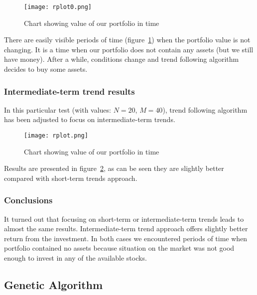 \begin{figure}[ht]
  
  \begin{center}
    \texttt{[image: rplot0.png]}
  \end{center}
  \caption{Chart showing value of our portfolio in time}
  \label{fig:trend-short}
\end{figure}

There are easily visible periods of time (figure~\ref{fig:trend-short}) when the portfolio value is not changing. 
It is a time when our portfolio does not contain any assets (but we still have money). 
After a while, conditions change and trend following algorithm decides to buy some assets.


\subsubsection{Intermediate-term trend results}

In this particular test (with values: $N = 20$, $M = 40$), trend following algorithm has been adjusted to focus on intermediate-term trends.
 
\begin{figure}[H]
  \begin{center}
    \texttt{[image: rplot.png]}
  \end{center}
  \caption{Chart showing value of our portfolio in time}
  \label{fig:trend-int}
\end{figure}

Results are presented in figure~\ref{fig:trend-int}, as can be seen they are slightly better compared with short-term trends approach.  

\subsubsection{Conclusions}

It turned out that focusing on short-term or intermediate-term trends leads to almost the same results.
Intermediate-term trend approach offers slightly better return from the investment.
In both cases we encountered periods of time when portfolio contained no assets because situation on the market was not good enough to invest in any of the available stocks.



\subsection{Genetic Algorithm}

